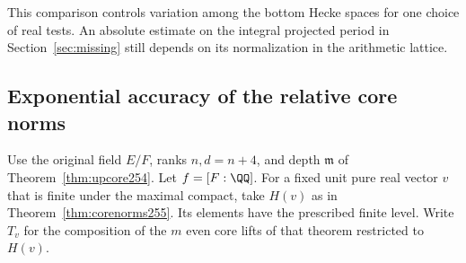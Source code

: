 \documentclass[a4paper,11pt]{article}
\theoremstyle{definition}
\theoremstyle{remark}
\numberwithin{equation}{section}
\begin{document}
This comparison controls variation among the bottom Hecke spaces
for one choice of real tests. An absolute estimate on the integral
projected period in Section~\ref{sec:missing} still depends on its
normalization in the arithmetic lattice.

\subsection{Exponential accuracy of the relative core norms}\label{nav:II-49}
Use the original field \(E/F\), ranks \(n,d=n+4\), and depth
\(\mathfrak m\) of Theorem~\ref{thm:upcore254}. Let
\(f=[F:\QQ]\). For a fixed unit pure real vector \(v\) that is
finite under the maximal compact, take \(H(v)\) as in
Theorem~\ref{thm:corenorms255}. Its elements have the prescribed
finite level. Write \(T_v\) for the composition of the \(m\)
even core lifts of that theorem restricted to \(H(v)\).
\end{document}
